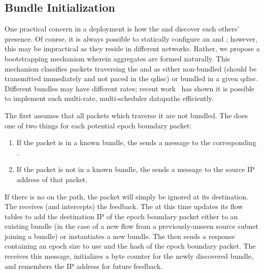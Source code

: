 \subsection{Bundle Initialization}\label{s:impl:discovery}

One practical concern in a \name deployment is how the \inbox and \outbox discover each others' presence. Of course, it is always possible to statically configure an \inbox and \outbox; however, this may be impractical as they reside in different networks.
Rather, we propose a bootstrapping mechanism wherein aggregates are formed naturally.
This mechanism classifies packets traversing the \inbox and \outbox as either non-bundled (should be transmitted immediately and not paced in the qdisc) or bundled in a given qdisc. Different bundles may have different rates; recent work~\cite{carousel, eifel} has shown it is possible to implement such multi-rate, multi-scheduler datapaths efficiently.

The \inbox first assumes that all packets which traverse it are not bundled.
The \outbox does one of two things for each potential epoch boundary packet:
\begin{enumerate}
    \item If the packet is in a known bundle, the \outbox sends a message to the corresponding \inbox.
    \item If the packet is not in a known bundle, the \outbox sends a message to the source IP address of that packet.
\end{enumerate}

If there is no \inbox on the path, the packet will simply be ignored at its destination. 
The \inbox receives (and intercepts) the \outbox feedback.  
The \inbox at this time updates its flow tables to add the destination IP of the epoch boundary packet either to an existing bundle (in the case of a new flow from a previously-unseen source subnet joining a bundle) or instantiates a new bundle.
The \inbox then sends a response containing an epoch size to use and the hash of the epoch boundary packet.
The \outbox receives this message, initializes a byte counter for the newly discovered bundle, and remembers the \inbox IP address for future feedback.